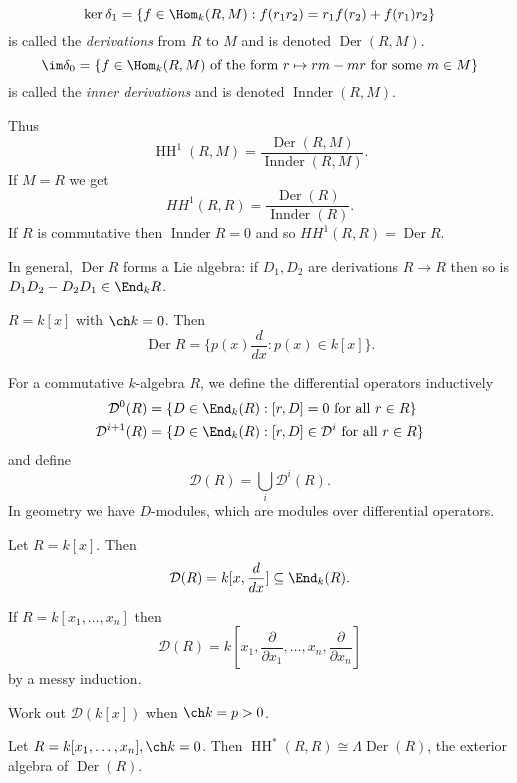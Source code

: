 \documentclass[a4paper]{article}
\DeclareMathOperator{\HH}{HH}
\DeclareMathOperator{\Der}{Der}
\DeclareMathOperator{\Innder}{Innder}
\begin{document}
\begin{definition}
  \[
    \ker \delta_1 = \{f \in \Hom_k(R, M): f(r_1r_2) = r_1f(r_2) + f(r_1)r_2\}
  \]
  is called the \emph{derivations} from \(R\) to \(M\) and is denoted \(\Der(R, M)\).
  \[
    \im \delta_0 = \{f \in \Hom_k(R, M) \text{ of the form } r \mapsto rm - mr \text{ for some } m \in M\}
  \]
  is called the \emph{inner derivations} and is denoted \(\Innder(R, M)\).
\end{definition}

Thus
\[
  \HH^1(R, M) = \frac{\Der(R, M)}{\Innder(R, M)}.
\]
If \(M = R\) we get
\[
  HH^1(R, R) = \frac{\Der(R)}{\Innder(R)}.
\]
If \(R\) is commutative then \(\Innder R = 0\) and so \(HH^1(R, R) = \Der R\).

In general, \(\Der R\) forms a Lie algebra: if \(D_1, D_2\) are derivations \(R \to R\) then so is \(D_1D_2 - D_2D_1 \in \End_k R\).

\begin{eg}
  \(R = k[x]\) with \(\ch k = 0\). Then
  \[
    \Der R = \{p(x) \frac{d}{dx}: p(x) \in k[x]\}.
  \]
\end{eg}

For a commutative \(k\)-algebra \(R\), we define the differential operators inductively
\begin{align*}
  \mathcal D^0(R) &= \{D \in \End_k(R): [r, D] = 0 \text{ for all } r \in R\} \\
  \mathcal D^{i + 1} (R) &= \{D \in \End_k(R): [r, D] \in \mathcal D^i \text{ for all } r \in R\} \\
\end{align*}
and define
\[
  \mathcal D(R) = \bigcup_i \mathcal D^i(R).
\]
In geometry we have \(D\)-modules, which are modules over differential operators.

\begin{eg}
  Let \(R = k[x]\). Then
  \[
    \mathcal D(R) = k[x, \frac{d}{dx}] \subseteq \End_k(R).
  \]

  If \(R = k[x_1, \dots, x_n]\) then
  \[
    \mathcal D(R) = k[x_1, \frac{\partial  }{\partial x_1}, \dots, x_n, \frac{\partial  }{\partial x_n}]
  \]
  by a messy induction.
\end{eg}

\begin{ex}
  Work out \(\mathcal D(k[x])\) when \(\ch k = p > 0\).
\end{ex}

\begin{theorem}
  Let \(R = k[x_1, \dots, x_n], \ch k = 0\). Then \(\HH^*(R, R) \cong \Lambda \Der (R)\), the exterior algebra of \(\Der(R)\).
\end{theorem}
\end{document}
